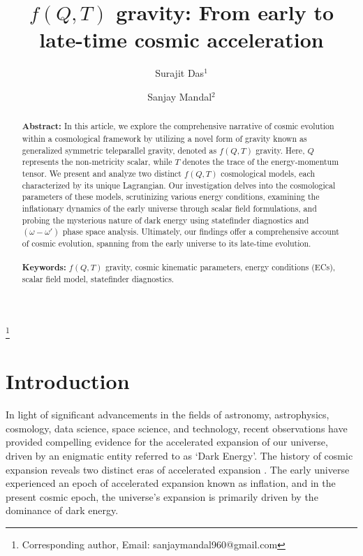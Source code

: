\documentclass[aps,prd,showpacs,nofootinbib,floats,floatfix,preprintnumbers,groupedaddress,twocolumn]{revtex4-1}
\begin{document}
    \title{$f(Q,T)$ gravity: From early to late-time cosmic acceleration}

    \author{Surajit Das$^{1}$}
    \author{Sanjay Mandal$^{2}$}
    
    \thanks{Corresponding author, Email: sanjaymandal960@gmail.com}
    


    
\begin{abstract}
\noindent
    \textbf{Abstract:} In this article, we explore the comprehensive narrative of cosmic evolution within a cosmological framework by utilizing a novel form of gravity known as generalized symmetric teleparallel gravity, denoted as $f(Q,T)$ gravity. Here, $Q$ represents the non-metricity scalar, while $T$ denotes the trace of the energy-momentum tensor. We present and analyze two distinct $f(Q,T)$ cosmological models, each characterized by its unique Lagrangian. Our investigation delves into the cosmological parameters of these models, scrutinizing various energy conditions, examining the inflationary dynamics of the early universe through scalar field formulations, and probing the mysterious nature of dark energy using statefinder diagnostics and $(\omega-\omega')$ phase space analysis. Ultimately, our findings offer a comprehensive account of cosmic evolution, spanning from the early universe to its late-time evolution.
\\ \\
    \textbf{Keywords:} $f(Q,T)$ gravity, cosmic kinematic parameters, energy conditions (ECs), scalar field model, statefinder diagnostics.
\end{abstract}


\maketitle




\section{Introduction}
\noindent
    In light of significant advancements in the fields of astronomy, astrophysics, cosmology, data science, space science, and technology, recent observations have provided compelling evidence for the accelerated expansion of our universe, driven by an enigmatic entity referred to as `Dark Energy'\cite{Riess1,Perlmutter1,Perlmutter2,Spergel1,Komatsu}. The history of cosmic expansion reveals two distinct eras of accelerated expansion \cite{Capoz}. The early universe experienced an epoch of accelerated expansion known as inflation, and in the present cosmic epoch, the universe's expansion is primarily driven by the dominance of dark energy.
\end{document}
